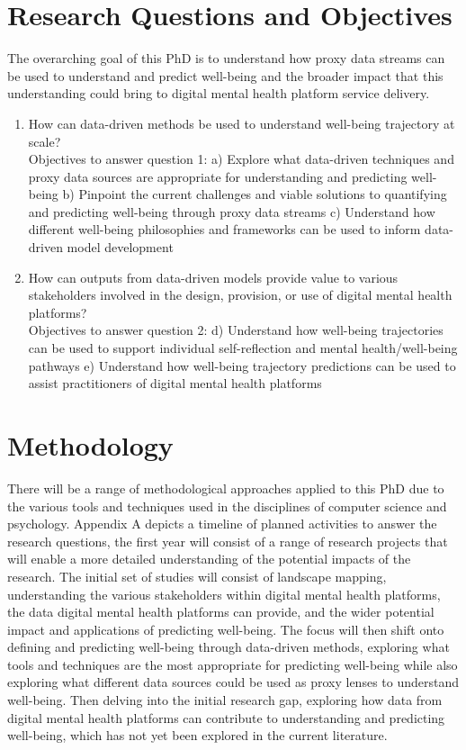 \documentclass[12pt]{article}
\begin{document}
\section{Research Questions and Objectives}
The overarching goal of this PhD is to understand how proxy data streams can be used to understand and predict well-being and the broader impact that this understanding could bring to digital mental health platform service delivery.\\
\begin{enumerate}
    \item How can data-driven methods be used to understand well-being trajectory at scale?\\
    Objectives to answer question 1:
     \subitem  a) Explore what data-driven techniques and proxy data sources are appropriate for understanding and predicting well-being
    \subitem b)	Pinpoint the current challenges and viable solutions to quantifying and predicting well-being through proxy data streams
    \subitem c)	Understand how different well-being philosophies and frameworks can be used to inform data-driven model development
    \item How can outputs from data-driven models provide value to various stakeholders involved in the design, provision, or use of digital mental health platforms? \\ 
    Objectives to answer question 2:
    \subitem d)	Understand how well-being trajectories can be used to support individual self-reflection and mental health/well-being pathways
    \subitem e) Understand how well-being trajectory predictions can be used to assist practitioners of digital mental health platforms 

\end{enumerate}
\clearpage
\section{Methodology}
There will be a range of methodological approaches applied to this PhD due to the various tools and techniques used in the disciplines of computer science and psychology. Appendix A depicts a timeline of planned activities to answer the research questions, the first year will consist of a range of research projects that will enable a more detailed understanding of the potential impacts of the research. The initial set of studies will consist of landscape mapping, understanding the various stakeholders within digital mental health platforms, the data digital mental health platforms can provide, and the wider potential impact and applications of predicting well-being. The focus will then shift onto defining and predicting well-being through data-driven methods, exploring what tools and techniques are the most appropriate for predicting well-being while also exploring what different data sources could be used as proxy lenses to understand well-being. Then delving into the initial research gap, exploring how data from digital mental health platforms can contribute to understanding and predicting well-being, which has not yet been explored in the current literature.\\
\end{document}
